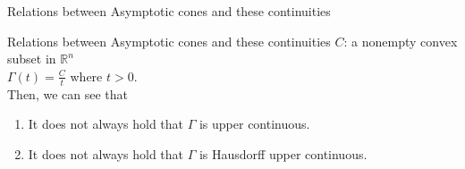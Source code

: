 \documentclass[aspectratio=169, dvipdfmx, 11pt]{beamer} %
\newcommand{\NDemenstionalRealEuclideanSpace}{\mathbb{R}^n}
\begin{document}
\begin{frame}[t]{Relations between Asymptotic cones and these continuities}
  \begin{block}{Relations between Asymptotic cones and these continuities}
    $C$: a nonempty convex subset in $\NDemenstionalRealEuclideanSpace$ \\
    $\Gamma (t) = \frac{C}{t}$ where $t > 0$. \\
    Then, we can see that
    \begin{enumerate}
      \item It does not always hold that $\Gamma$ is upper continuous.
      \item It does not always hold that $\Gamma$ is Hausdorff upper continuous.
    \end{enumerate}
  \end{block}


\end{frame}
\end{document}
